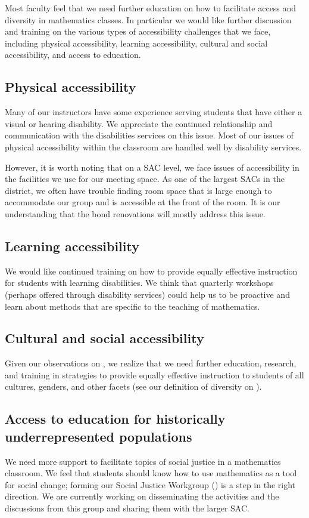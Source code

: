 Most faculty feel that we need further education on how to facilitate access and diversity in mathematics classes.
In particular we would like further discussion and training on the various types of accessibility challenges that we face, including physical accessibility, learning accessibility, cultural and social accessibility, and access to education.

\subsection{Physical accessibility}
Many of our instructors have some experience serving students that have either a visual or hearing disability.
We appreciate the continued relationship and communication with the disabilities services on this issue.
Most of our issues of physical accessibility within the classroom are handled well by disability services.

However, it is worth noting that on a SAC level, we face issues of accessibility in the facilities we use for our meeting space.
As one of the largest SACs in the district, we often have trouble finding room space that is large enough to accommodate our group and is accessible at the front of the room.
It is our understanding that the bond renovations will mostly address this issue.

\subsection{Learning accessibility}
We would like continued training on how to provide equally effective instruction for students with learning disabilities.
We think that quarterly workshops (perhaps offered through disability services) could help us to be proactive and learn about methods that are specific to the teaching of mathematics.

\subsection{Cultural and social accessibility}
Given our observations on , we realize that we need further education, research, and training in strategies to provide equally effective instruction to students of all cultures, genders, and other facets (see our definition of diversity on ).

\subsection{Access to education for historically underrepresented populations}
We need more support to facilitate topics of social justice in a mathematics classroom.
We feel that students should know how to use mathematics as a tool for social change; forming our Social Justice Workgroup () is a step in the right direction.
We are currently working on disseminating the activities and the discussions from this group and sharing them with the larger SAC.

